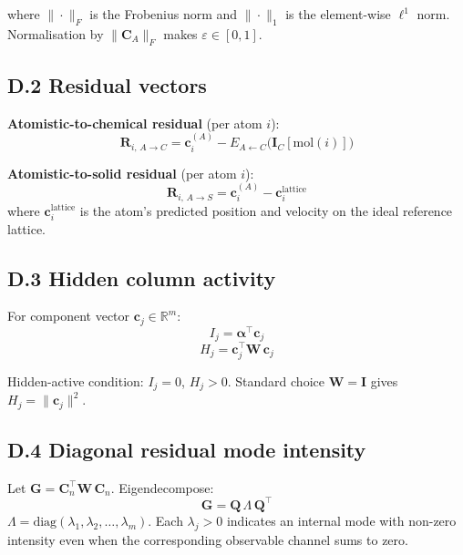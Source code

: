 \documentclass[11pt, a4paper, oneside]{article}
\newcommand{\Comp}[1]{\mathbf{C}_{#1}}
\newcommand{\Ident}[1]{\mathbf{I}_{#1}}
\newcommand{\Embed}[2]{E_{#2 \leftarrow #1}}
\newcommand{\DiagMode}{\Lambda}
\begin{document}
\begin{appendices}
where $\|\cdot\|_F$ is the Frobenius norm and $\|\cdot\|_1$ is the
element-wise $\ell^1$ norm. Normalisation by $\|\Comp{A}\|_F$ makes
$\varepsilon \in [0, 1]$.

\subsection*{D.2 Residual vectors}

\textbf{Atomistic-to-chemical residual} (per atom $i$):
\begin{equation}
  \mathbf{R}_{i,\,A \to C}
  = \mathbf{c}_i^{(A)} - \Embed{C}{A}\!\bigl(\Ident{C}[\mathrm{mol}(i)]\bigr)
  \tag{D.4}
\end{equation}

\textbf{Atomistic-to-solid residual} (per atom $i$):
\begin{equation}
  \mathbf{R}_{i,\,A \to S}
  = \mathbf{c}_i^{(A)} - \mathbf{c}_i^{\mathrm{lattice}}
  \tag{D.5}
\end{equation}
where $\mathbf{c}_i^{\mathrm{lattice}}$ is the atom's predicted position
and velocity on the ideal reference lattice.

\subsection*{D.3 Hidden column activity}

For component vector $\mathbf{c}_j \in \mathbb{R}^m$:
\begin{equation}
  I_j = \bm{\alpha}^\top \mathbf{c}_j
  \tag{D.6}
\end{equation}
\begin{equation}
  H_j = \mathbf{c}_j^\top \mathbf{W}\, \mathbf{c}_j
  \tag{D.7}
\end{equation}

Hidden-active condition: $I_j = 0$, $H_j > 0$.
Standard choice $\mathbf{W} = \mathbf{I}$ gives $H_j = \|\mathbf{c}_j\|^2$.

\subsection*{D.4 Diagonal residual mode intensity}

Let $\mathbf{G} = \Comp{n}^\top \mathbf{W}\, \Comp{n}$. Eigendecompose:
\begin{equation}
  \mathbf{G} = \mathbf{Q}\, \DiagMode\, \mathbf{Q}^\top
  \tag{D.8}
\end{equation}
$\DiagMode = \mathrm{diag}(\lambda_1, \lambda_2, \ldots, \lambda_m)$.
Each $\lambda_j > 0$ indicates an internal mode with non-zero intensity
even when the corresponding observable channel sums to zero.


\end{appendices}
\end{document}
